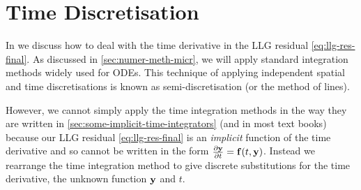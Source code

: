 


\section{Time Discretisation}
\label{sec:time-discretisation-resi}

In  we discuss how to deal with the time derivative in the LLG residual \cref{eq:llg-res-final}.
As discussed in \cref{sec:numer-meth-micr}, we will apply standard integration methods widely used for ODEs.
This technique of applying independent spatial and time discretisations is known as semi-discretisation (or the method of lines).

However, we cannot simply apply the time integration methods in the way they are written in \cref{sec:some-implicit-time-integrators} (and in most text books) because our LLG residual \cref{eq:llg-res-final} is an \emph{implicit} function of the time derivative and so cannot be written in the form $\frac{\partial \boldsymbol{\mathrm{y}}}{\partial t} = {\boldsymbol{\mathrm{f}}}(t, \boldsymbol{\mathrm{y}})$.
Instead we rearrange the time integration method to give discrete substitutions for the time derivative, the unknown function $\boldsymbol{\mathrm{y}}$ and $t$.

